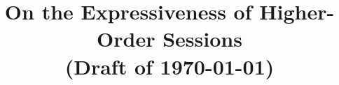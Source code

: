\documentclass[envcountsect,orivec]{llncs}
\begin{document}
\pagestyle{plain}

\title {
	On the Expressiveness of Higher-Order Sessions \\ (Draft of \today)
}
\maketitle






%
%

%

%

%

%





%
%
%
\end{document}
